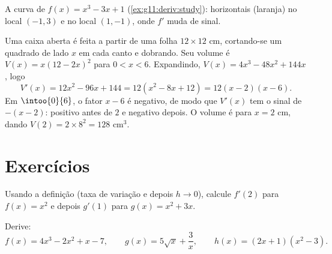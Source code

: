 \begin{omfigure}

{\small A curva de $f(x) = x^3 - 3x + 1$
(\cref{ex:g11:deriv:study}):  horizontais (laranja) no 
local $(-1, 3)$ e no  local $(1, -1)$, onde $f'$ muda de sinal.}
\end{omfigure}

\begin{example}[Otimização]\label{ex:g11:deriv:box}
Uma caixa aberta é feita a partir de uma folha $12 \times 12$ cm,
cortando-se um quadrado de lado $x$ em cada canto e dobrando. Seu volume
é $V(x) = x(12 - 2x)^2$ para $0 < x < 6$. Expandindo,
$V(x) = 4x^3 - 48x^2 + 144x$, logo
\[
V'(x) = 12x^2 - 96x + 144 = 12(x^2 - 8x + 12) = 12(x - 2)(x - 6).
\]
Em $\intoo{0}{6}$, o fator $x - 6$ é negativo, de modo que $V'(x)$ tem o
sinal de $-(x-2)$: positivo antes de $2$ e negativo depois. O volume é
 para $x = 2$ cm, dando $V(2) = 2 \times 8^2 = 128$ cm$^3$.
\end{example}

\section{Exercícios}

\begin{exercise}[$\star$]\label{exo:g11:deriv:1}
Usando a definição (taxa de variação e depois $h \to 0$), calcule $f'(2)$
para $f(x) = x^2$ e depois $g'(1)$ para $g(x) = x^2 + 3x$.
\end{exercise}

\begin{exercise}[$\star$]\label{exo:g11:deriv:2}
Derive:
\[
f(x) = 4x^3 - 2x^2 + x - 7, \qquad
g(x) = 5\sqrt{x} + \frac{3}{x}, \qquad
h(x) = (2x+1)(x^2 - 3) .
\]
\end{exercise}

